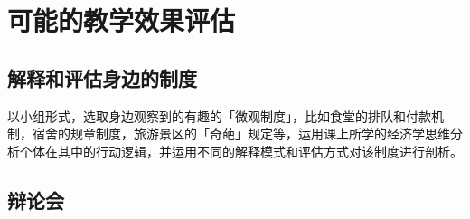 \documentclass[10pt,a4paper]{ctexart}
\newcommand{\field}[1]{\par\noindent\hangindent=0em\textbf{#1}\hspace{0.2em}}
\begin{document}

\section{可能的教学效果评估}

\subsection{解释和评估身边的制度}
以小组形式，选取身边观察到的有趣的「微观制度」，比如食堂的排队和付款机制，宿舍的规章制度，旅游景区的「奇葩」规定等，运用课上所学的经济学思维分析个体在其中的行动逻辑，并运用不同的解释模式和评估方式对该制度进行剖析。

\subsection{辩论会}
\end{document}
